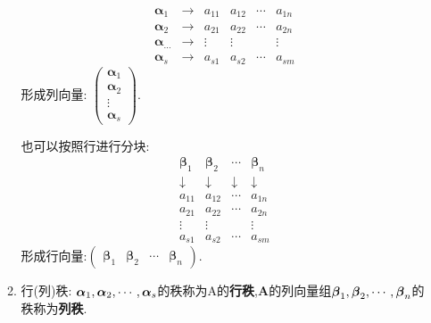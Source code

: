 \begin{enumerate}
\begin{enumerate}
\begin{minipage}[t]{1\columnwidth}
\[
\begin{array}{cccccc}
\boldsymbol{\alpha}_{1} & \rightarrow & a_{11} & a_{12} & \cdots & a_{1n}\\
\boldsymbol{\alpha}_{2} & \rightarrow & a_{21} & a_{22} & \cdots & a_{2n}\\
\boldsymbol{\alpha}_{...} & \rightarrow & \vdots & \vdots &  & \vdots\\
\boldsymbol{\alpha}_{s} & \rightarrow & a_{s1} & a_{s2} & \cdots & a_{sm}
\end{array}
\]
形成列向量: $\begin{pmatrix}\boldsymbol{\alpha}_{1}\\
\boldsymbol{\alpha}_{2}\\
\vdots\\
\boldsymbol{\alpha}_{s}
\end{pmatrix}$.

也可以按照行进行分块: 
\[
\begin{array}{cccc}
\boldsymbol{\beta}_{1} & \boldsymbol{\beta}_{2} & \cdots & \boldsymbol{\beta}_{n}\\
\downarrow & \downarrow & \downarrow & \downarrow\\
a_{11} & a_{12} & \cdots & a_{1n}\\
a_{21} & a_{22} & \cdots & a_{2n}\\
\vdots & \vdots &  & \vdots\\
a_{s1} & a_{s2} & \cdots & a_{sm}
\end{array}
\]
形成行向量:$\begin{pmatrix}\boldsymbol{\beta}_{1} & \boldsymbol{\beta}_{2} & \cdots & \boldsymbol{\beta}_{n}\end{pmatrix}$. %
\end{minipage}
\item 行(列)秩: $\boldsymbol{\alpha}_{1},\boldsymbol{\alpha}_{2},\cdots,\boldsymbol{\alpha}_{s}$的秩称为A的\textbf{行秩},$\boldsymbol{A}$的列向量组$\boldsymbol{\beta}_{1},\boldsymbol{\beta}_{2},\cdots,\boldsymbol{\beta}_{n}$的秩称为\textbf{列秩}. 
\end{enumerate}
\end{enumerate}

